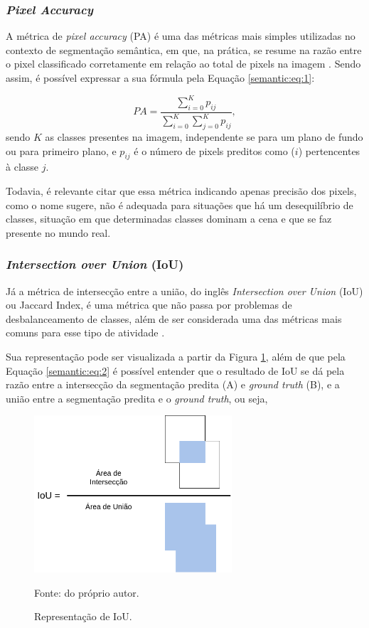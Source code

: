 \subsubsection{\textit{Pixel Accuracy}}
\label{semantic:pa}

A métrica de \textit{pixel accuracy} (PA) é uma das métricas mais simples utilizadas no contexto de segmentação semântica, em que, na prática, se resume na razão entre o pixel classificado corretamente em relação ao total de pixels na imagem \cite{Minaee2021}. Sendo assim, é possível expressar a sua fórmula pela Equação \ref{semantic:eq:1}:

\begin{equation}
    \label{semantic:eq:1}
    PA = \frac{\sum_{i=0}^{K} p_{ij}}{\sum_{i=0}^{K} \sum_{j=0}^{K} p_{ij}},
\end{equation}
sendo $K$ as classes presentes na imagem, independente se para um plano de fundo ou para primeiro plano, e $p_{ij}$ é o número de pixels preditos como ($i$) pertencentes à classe $j$.

Todavia, é relevante citar que essa métrica indicando apenas precisão dos pixels, como o nome sugere, não é adequada para situações que há um desequilíbrio de classes, situação em que determinadas classes dominam a cena e que se faz presente no mundo real.


\subsubsection{\textit{Intersection over Union} (IoU)}
\label{semantic:IoU}

Já a métrica de intersecção entre a união, do inglês \textit{Intersection over Union} (IoU) ou Jaccard Index, é uma métrica que não passa por problemas de desbalanceamento de classes, além de ser considerada uma das métricas mais comuns para esse tipo de atividade \cite{Minaee2021}.

Sua representação pode ser visualizada a partir da Figura \ref{semantic:fig:1}, além de que pela Equação \ref{semantic:eq:2} é possível entender que o resultado de IoU se dá pela razão entre a intersecção da segmentação predita (A) e \textit{ground truth} (B), e a união entre a segmentação predita e o \textit{ground truth}, ou seja,

\begin{figure}[H]
    \centering
    \caption{Representação de IoU.}
    \includegraphics[height=2.3in]{recursos/imagens/semantic/IoU.png}
    \label{semantic:fig:1}

    \vspace*{1 cm}
    Fonte: do próprio autor.
\end{figure}

